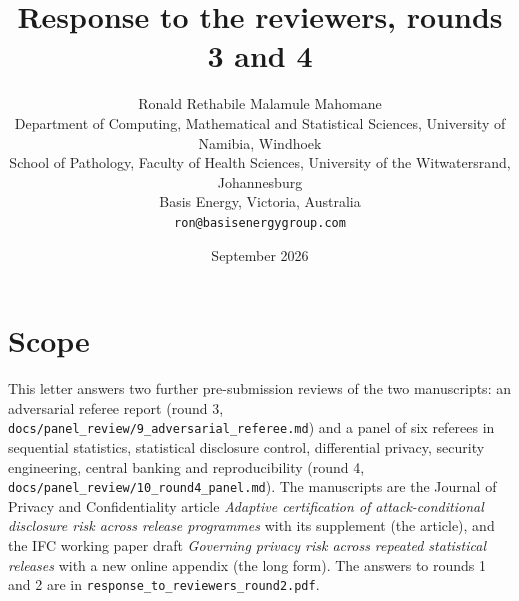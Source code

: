 \documentclass[11pt,a4paper]{article}
\title{\bfseries Response to the reviewers, rounds 3 and 4}
\author{Ronald Rethabile Malamule Mahomane\\[2pt]
\small Department of Computing, Mathematical and Statistical Sciences, University of Namibia, Windhoek\\
\small School of Pathology, Faculty of Health Sciences, University of the Witwatersrand, Johannesburg\\
\small Basis Energy, Victoria, Australia\\
\small \texttt{ron@basisenergygroup.com}}
\date{September 2026}
\begin{document}
\maketitle
\sloppy

\section*{Scope}
This letter answers two further pre-submission reviews of the two manuscripts: an adversarial referee report (round 3, \texttt{docs/panel\_review/9\_adversarial\_referee.md}) and a panel of six referees in sequential statistics, statistical disclosure control, differential privacy, security engineering, central banking and reproducibility (round 4, \texttt{docs/panel\_review/10\_round4\_panel.md}). The manuscripts are the Journal of Privacy and Confidentiality article \emph{Adaptive certification of attack-conditional disclosure risk across release programmes} with its supplement (the article), and the IFC working paper draft \emph{Governing privacy risk across repeated statistical releases} with a new online appendix (the long form). The answers to rounds 1 and 2 are in \texttt{response\_to\_reviewers\_round2.pdf}.
\end{document}
